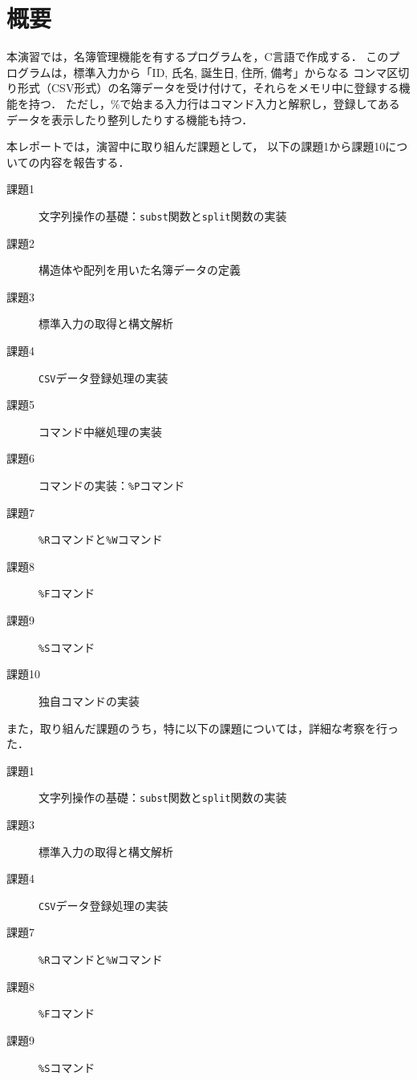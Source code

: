 \section{概要} \label{sec:abstract}

本演習では，名簿管理機能を有するプログラムを，C言語で作成する．
このプログラムは，標準入力から「ID, 氏名, 誕生日, 住所, 備考」からなる
コンマ区切り形式（CSV形式）の名簿データを受け付けて，それらをメモリ中に登録する機能を持つ．
ただし，\%で始まる入力行はコマンド入力と解釈し，登録してあるデータを表示したり整列したりする機能も持つ．

本レポートでは，演習中に取り組んだ課題として，
以下の課題1から課題10についての内容を報告する．
%
\begin{description}
  \item[課題1] 文字列操作の基礎：\verb|subst|関数と\verb|split|関数の実装
  \item[課題2] 構造体や配列を用いた名簿データの定義
  \item[課題3] 標準入力の取得と構文解析
  \item[課題4] \verb|CSV|データ登録処理の実装
  \item[課題5] コマンド中継処理の実装
  \item[課題6] コマンドの実装：\verb|%P|コマンド
  \item[課題7] \verb|%R|コマンドと\verb|%W|コマンド
  \item[課題8] \verb|%F|コマンド
  \item[課題9] \verb|%S|コマンド
  \item[課題10] 独自コマンドの実装
\end{description}
%
また，取り組んだ課題のうち，特に以下の課題については，詳細な考察を行った．
%
\begin{description}
  \item[課題1] 文字列操作の基礎：\verb|subst|関数と\verb|split|関数の実装
  \item[課題3] 標準入力の取得と構文解析
  \item[課題4] \verb|CSV|データ登録処理の実装
  \item[課題7] \verb|%R|コマンドと\verb|%W|コマンド
  \item[課題8] \verb|%F|コマンド
  \item[課題9] \verb|%S|コマンド
\end{description}


